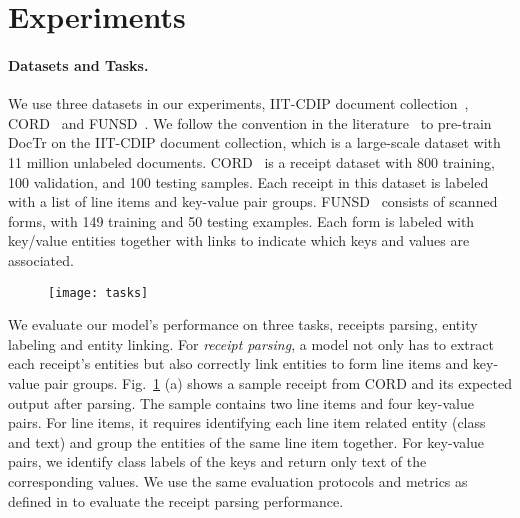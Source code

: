 \section{Experiments}
\graphicspath{ {./images/} }

\paragraph{Datasets and Tasks.} We use three datasets in our experiments, IIT-CDIP document collection~\cite{lewis2006building}, CORD~\cite{park2019cord} and FUNSD~\cite{jaume2019funsd}. We follow the convention in the literature~\cite{xu2020layoutlm,xu2021layoutlmv2,hong2021bros,appalaraju2021docformer} to pre-train DocTr on the IIT-CDIP document collection, which is a large-scale dataset with 11 million unlabeled documents.  CORD~\cite{park2019cord} is a receipt dataset with 800 training, 100 validation, and 100 testing samples. Each receipt in this dataset is labeled with a list of line items and key-value pair groups. FUNSD~\cite{jaume2019funsd} consists of scanned forms, with 149 training and 50 testing examples. Each form is labeled with key/value entities together with links to indicate which keys and values are associated.

\begin{figure}[t]
  \centering
  \texttt{[image: tasks]}
  \vspace{-1.5em}
  \label{fig:tasks}
  \vspace{-1.5em}
\end{figure}

We evaluate our model's performance on three tasks, receipts parsing, entity labeling and entity linking. For \textit{receipt parsing}, a model not only has to extract each receipt's entities but also correctly link entities to form line items and key-value pair groups. Fig.~\ref{fig:tasks} (a) shows a sample receipt from CORD and its expected output after parsing. The sample contains two line items and four key-value pairs. For line items, it requires identifying each line item related entity (class and text) and group the entities of the same line item together. For key-value pairs, we identify class labels of the keys and return only text of the corresponding values. We use the same evaluation protocols and metrics as defined in \cite{hwang2020spatial} to evaluate the receipt parsing performance.

